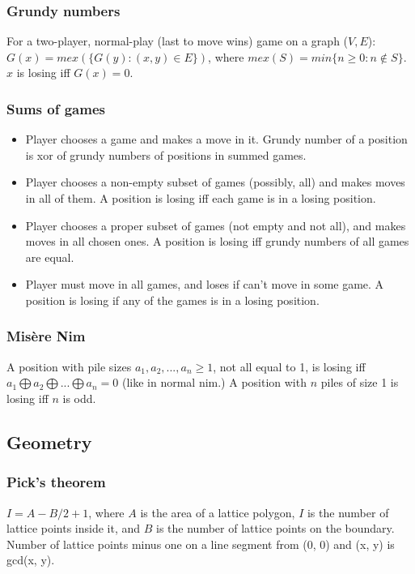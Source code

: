 \documentclass[a4paper,13pt]{article}
\begin{document}
\subsubsection{Grundy numbers}
For a two-player, normal-play (last to move wins) game on a graph ($V,E$): $G(x)=mex(\{G(y) : (x,y) \in E\})$, where $mex(S)=min\{n \geq 0 : n \not\in S\}$. $x$ is losing iff $G(x)=0$.

\subsubsection{Sums of games}
\begin{itemize}
\item Player chooses a game and makes a move in it. Grundy number of a position is xor of grundy numbers of positions in summed games.
\item Player chooses a non-empty subset of games (possibly, all) and makes moves in all of them. A position is losing iff each game is in a losing position.
\item Player chooses a proper subset of games (not empty and not all), and makes moves in all chosen ones. A position is losing iff grundy numbers of all games are equal.
\item Player must move in all games, and loses if can’t move in some game. A position is losing if any of the games is in a losing position.
\end{itemize}

\subsubsection{Misère Nim}
A position with pile sizes $a_1,a_2,...,a_n \geq 1$, not all equal to 1, is losing iff $a_1 \bigoplus a_2 \bigoplus ... \bigoplus a_n = 0$ (like in normal nim.)
A position with $n$ piles of size 1 is losing iff $n$ is odd.

\subsection{Geometry}

\subsubsection{Pick's theorem}
$I = A - B/2 + 1$, where $A$ is the area of a lattice polygon, $I$ is the number of lattice points inside it, and $B$ is the number of lattice points on the boundary. Number of lattice points minus one on a line segment from (0, 0) and (x, y) is gcd(x, y).
\end{document}
